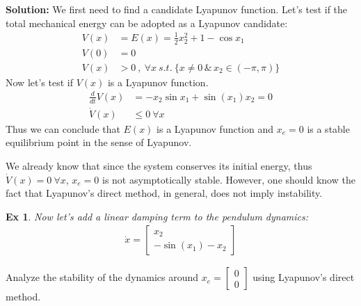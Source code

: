 \documentclass[twoside, 11pt]{article}
\newtheorem{exmp}[theorem]{Ex}
\begin{document}
\textbf{Solution:} We first need to find a candidate Lyapunov function. Let's test if
the total mechanical energy can be adopted as a Lyapunov candidate:
%
\begin{align*}
V(x) &= E(x) = \frac{1}{2} x_2^2 + 1 - \cos{x_1}  \\ 
V(0) &= 0 \\
V(x) &> 0 \ , \ \forall x \ s.t. \ \lbrace x \neq 0 \, \& \, x_2 \in (-\pi , \pi)  \rbrace
\end{align*}
%
Now let's test if $V(x)$ is a Lyapunov function.
%
\begin{align*}
\frac{d}{dt} V(x) &= - x_2 \sin x_1 + \sin(x_1) x_2 = 0
\\
\dot{V}(x) &\leq 0 \ \forall x 
\end{align*}
%
Thus we can conclude that $E(x)$ is a Lyapunov function and $x_e = 0$
is a stable equilibrium point in the sense of Lyapunov. 

We already know that since the system conserves its initial energy, thus 
$\dot{V}(x) = 0 \ \forall x $, $x_e = 0$ is not asymptotically stable. 
However, one should know the fact that Lyapunov's direct method, in general, does not imply 
instability.

\begin{exmp}
    Now let's add a linear damping term to the pendulum dynamics:
    \begin{align*}
    \dot{x} = \begin{bmatrix} x_2 \\ -\sin(x_1) - x_2 \end{bmatrix}
\end{align*}
\end{exmp}
Analyze the stability of the dynamics around $x_e = \begin{bmatrix} 0 \\ 0 \end{bmatrix}$ using Lyapunov's direct method.
\end{document}
